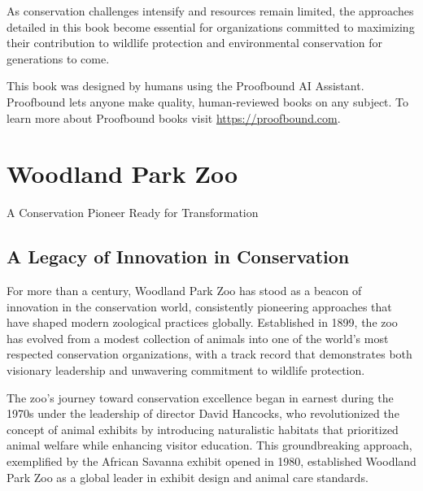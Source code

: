 \documentclass[
  Letterpaper,
]{scrbook}
\begin{document}
As conservation challenges intensify and resources remain limited, the
approaches detailed in this book become essential for organizations
committed to maximizing their contribution to wildlife protection and
environmental conservation for generations to come.

\begin{tcolorbox}[enhanced jigsaw, title=\textcolor{quarto-callout-note-color}{\faInfo}\hspace{0.5em}{About This Book}, coltitle=black, leftrule=.75mm, rightrule=.15mm, opacityback=0, left=2mm, arc=.35mm, toptitle=1mm, colback=white, toprule=.15mm, colframe=quarto-callout-note-color-frame, bottomtitle=1mm, breakable, opacitybacktitle=0.6, titlerule=0mm, bottomrule=.15mm, colbacktitle=quarto-callout-note-color!10!white]

This book was designed by humans using the Proofbound AI Assistant.
Proofbound lets anyone make quality, human-reviewed books on any
subject. To learn more about Proofbound books visit
\url{https://proofbound.com}.

\end{tcolorbox}


\chapter{Woodland Park Zoo}\label{woodland-park-zoo}

A Conservation Pioneer Ready for Transformation

\hfill\break

\section{A Legacy of Innovation in
Conservation}\label{a-legacy-of-innovation-in-conservation}

For more than a century, Woodland Park Zoo has stood as a beacon of
innovation in the conservation world, consistently pioneering approaches
that have shaped modern zoological practices globally. Established in
1899, the zoo has evolved from a modest collection of animals into one
of the world's most respected conservation organizations, with a track
record that demonstrates both visionary leadership and unwavering
commitment to wildlife protection.

The zoo's journey toward conservation excellence began in earnest during
the 1970s under the leadership of director David Hancocks, who
revolutionized the concept of animal exhibits by introducing
naturalistic habitats that prioritized animal welfare while enhancing
visitor education. This groundbreaking approach, exemplified by the
African Savanna exhibit opened in 1980, established Woodland Park Zoo as
a global leader in exhibit design and animal care standards.
\end{document}
